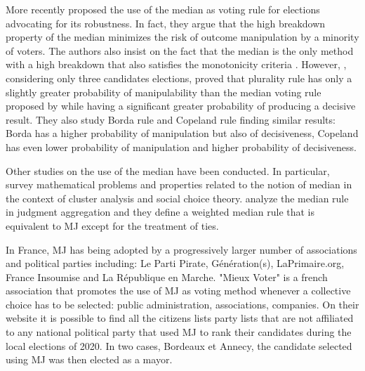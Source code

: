 More recently \citet{Bassett1999} proposed the use of the median as voting rule for elections advocating for its robustness. In fact, they argue that the high breakdown property of the median minimizes the risk of outcome manipulation by a minority of voters. The authors also insist on the fact that the median is the only method with a high breakdown that also satisfies the monotonicity criteria \citep{Bassett1994}. 
However, \citet{Gehrlein2003}, considering only three candidates elections, proved that plurality rule has only a slightly greater probability of manipulability than the median voting rule proposed by \citet{Bassett1999} while having a significant greater probability of producing a decisive result. They also study Borda rule and Copeland rule finding similar results: Borda has a higher probability of manipulation but also of decisiveness, Copeland has even lower probability of manipulation and higher probability of decisiveness.

Other studies on the use of the median have been conducted. In particular, \citet{Barthelemy1981} survey mathematical problems and properties related to the notion of median in the context of cluster analysis and social choice theory.
\cite{Nehring2022} analyze the median rule in judgment aggregation and they define a weighted median rule that is equivalent to \acs{MJ} except for the treatment of ties.

In France, \ac{MJ} has being adopted by a progressively larger number of associations and political parties including: Le Parti Pirate, Génération(s), LaPrimaire.org, France Insoumise and La République en Marche.
"Mieux Voter" \citep{MV} is a french association that promotes the use of \ac{MJ} as voting method whenever a collective choice has to be selected: public administration, associations, companies. On their website it is possible to find all the citizens lists \textendash party lists that are not affiliated to any national political party \textemdash that used \ac{MJ} to rank their candidates during the local elections of 2020. In two cases, Bordeaux et Annecy, the candidate selected using \ac{MJ} was then elected as a mayor. 

